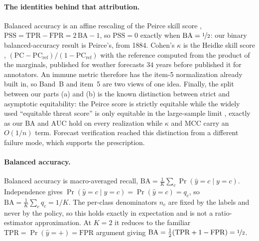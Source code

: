 \documentclass{article}
\theoremstyle{plain}
\theoremstyle{definition}
\begin{document}
\paragraph{The identities behind that attribution.}
Balanced accuracy is an affine rescaling of the Peirce skill score \citep{peirce1884}, $\mathrm{PSS} = \mathrm{TPR} - \mathrm{FPR} = 2\,\mathrm{BA} - 1$, so $\mathrm{PSS} = 0$ exactly when $\mathrm{BA} = \nicefrac{1}{2}$: our binary balanced-accuracy result is Peirce's, from 1884. Cohen's $\kappa$ is the Heidke skill score \citep{heidke1926}, $(\mathrm{PC} - \mathrm{PC}_{\mathrm{ref}})/(1 - \mathrm{PC}_{\mathrm{ref}})$ with the reference computed from the product of the marginals, published for weather forecasts $34$ years before \citet{cohen1960kappa} published it for annotators. An immune metric therefore has the item-5 normalization already built in, so Band~B and item~5 are two views of one idea. Finally, the split between our parts (a) and (b) is the known distinction between strict and asymptotic equitability: the Peirce score is strictly equitable while the widely used ``equitable threat score'' is only equitable in the large-sample limit \citep{hogan2010equitability}, exactly as our $\mathrm{BA}$ and $\mathrm{AUC}$ hold on every realization while $\kappa$ and MCC carry an $O(1/n)$ term. Forecast verification reached this distinction from a different failure mode, which supports the prescription.

\paragraph{Balanced accuracy.}
Balanced accuracy is macro-averaged recall, $\mathrm{BA} = \frac{1}{K}\sum_c \Pr(\hat{y}=c \mid y=c)$. Independence gives $\Pr(\hat{y}=c \mid y=c) = \Pr(\hat{y}=c) = q_c$, so $\mathrm{BA} = \frac{1}{K}\sum_c q_c = 1/K$. The per-class denominators $n_c$ are fixed by the labels and never by the policy, so this holds exactly in expectation and is not a ratio-estimator approximation. At $K = 2$ it reduces to the familiar $\mathrm{TPR} = \Pr(\hat{y}=+) = \mathrm{FPR}$ argument giving $\mathrm{BA} = \tfrac{1}{2}(\mathrm{TPR} + 1 - \mathrm{FPR}) = \nicefrac{1}{2}$.
\end{document}
